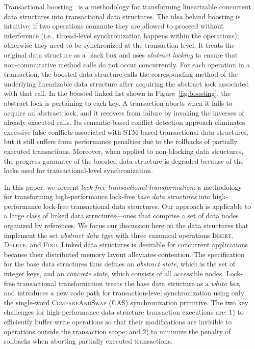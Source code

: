 \documentclass[]{sig-alternate-05-2015}
\begin{document}
Transactional boosting~\cite{herlihy2008transactional} is a methodology for transforming linearizable concurrent data structures into transactional data structures.
The idea behind boosting is intuitive: if two operations commute they are allowed to proceed without interference (i.e., thread-level synchronization happens within the operations); otherwise they need to be synchronized at the transaction level.
It treats the original data structure as a black box and uses \emph{abstract locking} to ensure that non-commutative method calls do not occur concurrently. 
For each operation in a transaction, the boosted data structure calls the corresponding method of the underlying linearizable data structure after acquiring the abstract lock associated with that call. 
In the boosted linked list shown in Figure~\ref{fig:boosting}, the abstract lock is pertaining to each key.  
A transaction aborts when it fails to acquire an abstract lock, and it recovers from failure by invoking the inverses of already executed calls. 
Its semantic-based conflict detection approach eliminates excessive false conflicts associated with STM-based transactional data structures, but it still suffers from performance penalties due to the rollbacks of partially executed transactions.
Moreover, when applied to non-blocking data structures, the progress guarantee of the boosted data structure is degraded because of the locks used for transactional-level synchronization.

In this paper, we present \emph{lock-free transactional transformation}: a methodology for transforming high-performance lock-free \emph{base data structures} into high-performance lock-free transactional data structures.
Our approach is applicable to a large class of linked data structures---ones that comprise a set of data nodes organized by references. 
We focus our discussion here on the data structures that implement the set \emph{abstract data type} with three canonical operations \textsc{Insert}, \textsc{Delete}, and \textsc{Find}.
Linked data structures is desirable for concurrent applications because their distributed memory layout alleviates contention.
The specification for the base data structures thus defines an \emph{abstract state}, which is the set of integer keys, and an \emph{concrete state}, which consists of all accessible nodes.
Lock-free transactional transformation treats the base data structure as a \emph{white box}, and introduces a new code path for transaction-level synchronization using only the single-word \textsc{CompareAndSwap} (CAS) synchronization primitive.
The two key challenges for high-performance data structure transaction executions are: 1) to efficiently buffer write operations so that their modifications are invisible to operations outside the transaction scope; and 2) to minimize the penalty of rollbacks when aborting partially executed transactions. 
\end{document}
